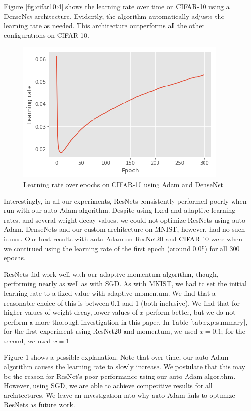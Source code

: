 \documentclass{article}
\begin{document}
Figure \ref{fig:cifar10:4} shows the learning rate over time on CIFAR-10 using a DenseNet architecture. Evidently, the algorithm automatically adjusts the learning rate as needed. This architecture outperforms all the other configurations on CIFAR-10.

\begin{figure}
    \centering
    \includegraphics[scale=0.4]{cifar10-dn-adam.png}
    \caption{Learning rate over epochs on CIFAR-10 using Adam and DenseNet}
    \label{fig:cifar10:5}
\end{figure}

Interestingly, in all our experiments, ResNets consistently performed poorly when run with our auto-Adam algorithm. Despite using fixed and adaptive learning rates, and several weight decay values, we could not optimize ResNets using auto-Adam. DenseNets and our custom architecture on MNIST, however, had no such issues. Our best results with auto-Adam on ResNet20 and CIFAR-10 were when we continued using the learning rate of the first epoch (around 0.05) for all 300 epochs. 

ResNets did work well with our adaptive momentum algorithm, though, performing nearly as well as with SGD. As with MNIST, we had to set the initial learning rate to a fixed value with adaptive momentum. We find that a reasonable choice of this is between 0.1 and 1 (both inclusive). We find that for higher values of weight decay, lower values of $x$ perform better, but we do not perform a more thorough investigation in this paper. In Table \ref{tab:exp:summary}, for the first experiment using ResNet20 and momentum, we used $x = 0.1$; for the second, we used $x = 1$.

Figure \ref{fig:cifar10:5} shows a possible explanation. Note that over time, our auto-Adam algorithm causes the learning rate to slowly increase. We postulate that this may be the reason for ResNet's poor performance using our auto-Adam algorithm. However, using SGD, we are able to achieve competitive results for all architectures. We leave an investigation into why auto-Adam fails to optimize ResNets as future work.
\end{document}
